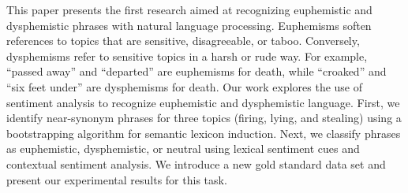 This paper presents the first research aimed at recognizing euphemistic and dysphemistic phrases with natural language processing.  Euphemisms soften references to topics that are sensitive, disagreeable, or taboo.  Conversely, dysphemisms refer to sensitive topics in a harsh or rude way. For example, ``passed away'' and ``departed'' are euphemisms for death, while ``croaked'' and ``six feet under'' are dysphemisms for death. Our work explores the use of sentiment analysis to recognize euphemistic and dysphemistic language. First, we identify near-synonym phrases for three topics (firing, lying, and stealing) using a bootstrapping algorithm for semantic lexicon induction. Next, we classify phrases as euphemistic, dysphemistic, or neutral using lexical sentiment cues and contextual sentiment analysis.  We introduce a new gold standard data set and present our experimental results for this task.
